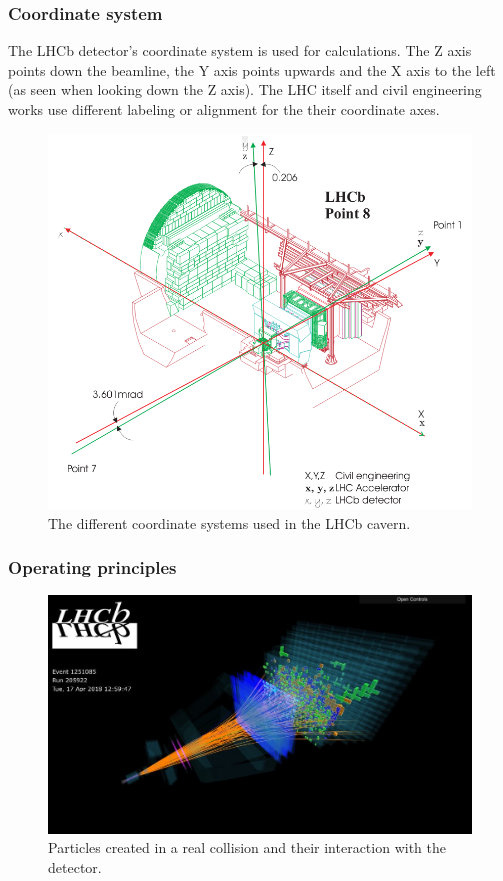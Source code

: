 \documentclass[12pt]{article}
\begin{document}
\subsubsection{Coordinate system}\label{sec_coordinate_system}

The LHCb detector's coordinate system is used for calculations. The Z axis points down the beamline, the Y axis points upwards and the X axis to the left (as seen when looking down the Z axis). The LHC itself and civil engineering works use different labeling or alignment for the their coordinate axes.

\begin{figure}[H]
	\includegraphics[width=\textwidth]{intro_lhcb_coordinate_systems}
	\caption{The different coordinate systems used in the LHCb cavern.}
	\label{fig_lhcb_coordinate_systems}
\end{figure}


\subsubsection{Operating principles}\label{sec_lhcb_det_theory}

\begin{figure}[H]
	\includegraphics[width=\textwidth]{lbevent_collision_example}
	\caption{Particles created in a real collision and their interaction with the detector.}
	\label{fig_lhcb_lbevent_collision}
\end{figure}
\end{document}
